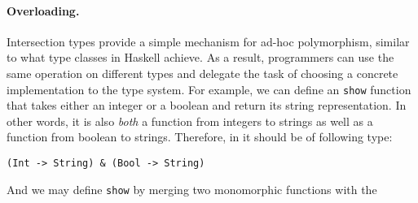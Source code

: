 \paragraph{Overloading.} Intersection types provide a simple mechanism for
ad-hoc polymorphism, similar to what type classes in Haskell achieve. As a
result, programmers can use the same operation on different types and delegate
the task of choosing a concrete implementation to the type system. For example,
we can define an \lstinline{show} function that takes either an integer or a
boolean and return its string representation. In other words, it is also
\emph{both} a function from integers to strings as well as a function from
boolean to strings. Therefore, in \name it should be of following type:
\begin{lstlisting}
(Int -> String) & (Bool -> String)
\end{lstlisting}
And we may define \lstinline{show} by merging two monomorphic functions with the
